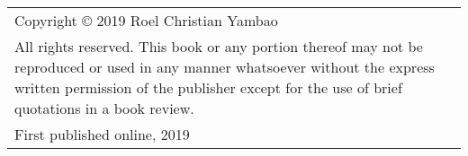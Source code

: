 \thispagestyle{empty}

    \vspace*{\fill}
\begin{flushleft}

\begin{tabularx}{\textwidth}{Y}
Copyright © 2019 Roel Christian Yambao\\
\addlinespace
All rights reserved. This book or any portion thereof may not be reproduced or used in any manner whatsoever without the express written permission of the publisher except for the use of brief quotations in a book review.\\
\addlinespace
First published online, 2019

\end{tabularx}

\end{flushleft}
